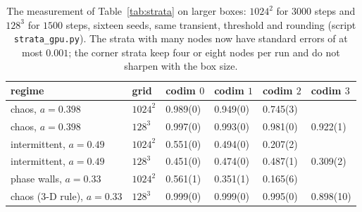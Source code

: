 \documentclass[11pt,a4paper]{article}
\theoremstyle{definition}
\theoremstyle{remark}
\begin{document}
\begin{table}[tbp]
\centering
\begin{tabular}{@{}llllll@{}}
\toprule
regime & grid & codim $0$ & codim $1$ & codim $2$ & codim $3$ \\
\midrule
chaos, $a=0.398$ & $1024^2$ & 0.989(0) & 0.949(0) & 0.745(3) & \\
chaos, $a=0.398$ & $128^3$  & 0.997(0) & 0.993(0) & 0.981(0) & 0.922(1) \\
intermittent, $a=0.49$ & $1024^2$ & 0.551(0) & 0.494(0) & 0.207(2) & \\
intermittent, $a=0.49$ & $128^3$  & 0.451(0) & 0.474(0) & 0.487(1) & 0.309(2) \\
phase walls, $a=0.33$ & $1024^2$ & 0.561(1) & 0.351(1) & 0.165(6) & \\
chaos (3-D rule), $a=0.33$ & $128^3$ & 0.999(0) & 0.999(0) & 0.995(0) & 0.898(10) \\
\bottomrule
\end{tabular}
\caption{The measurement of Table~\ref{tab:strata} on larger boxes:
$1024^2$ for $3000$ steps and $128^3$ for $1500$ steps, sixteen seeds,
same transient, threshold and rounding (script \texttt{strata\_gpu.py}).
The strata with many nodes now have standard errors of at most $0.001$; the
corner strata keep four or eight nodes per run and do not sharpen with
the box size.}
\label{tab:strata_big}
\end{table}
\end{document}
